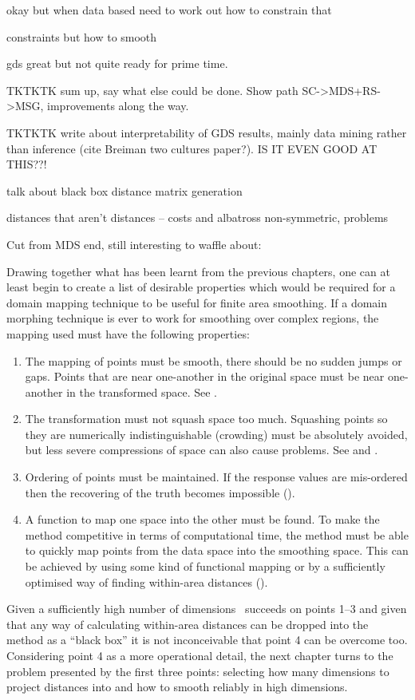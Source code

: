 okay but when data based need to work out how to constrain that

constraints but how to smooth

gds great but not quite ready for prime time.


TKTKTK sum up, say what else could be done. Show path SC->MDS+RS->MSG, improvements along the way.

TKTKTK write about interpretability of GDS results, mainly data mining rather than inference (cite Breiman two cultures paper?). IS IT EVEN GOOD AT THIS??!



talk about black box distance matrix generation

distances that aren't distances -- costs and albatross non-symmetric, problems


Cut from MDS end, still interesting to waffle about:

Drawing together what has been learnt from the previous chapters, one can at least begin to create a list of desirable properties which would be required for a domain mapping technique to be useful for finite area smoothing. If a domain morphing technique is ever to work for smoothing over complex regions, the mapping used must have the following properties:

\begin{enumerate}
\item The mapping of points must be smooth, there should be no sudden jumps or gaps. Points that are near one-another in the original space must be near one-another in the transformed space. See .
\item The transformation must not squash space too much. Squashing points so they are numerically indistinguishable (crowding) must be absolutely avoided, but less severe compressions of space can also cause problems. See  and .
\item Ordering of points must be maintained. If the response values are mis-ordered then the recovering of the truth becomes impossible ().
\item A function to map one space into the other must be found. To make the method competitive in terms of computational time, the method must be able to quickly map points from the data space into the smoothing space. This can be achieved by using some kind of functional mapping or by a sufficiently optimised way of finding within-area distances ().
\end{enumerate}

Given a sufficiently high number of dimensions \mdsap\ succeeds on points 1--3 and given that any way of calculating within-area distances can be dropped into the method as a ``black box'' it is not inconceivable that point 4 can be overcome too. Considering point 4 as a more operational detail, the next chapter turns to the problem presented by the first three points: selecting how many dimensions to project distances into and how to smooth reliably in high dimensions.






